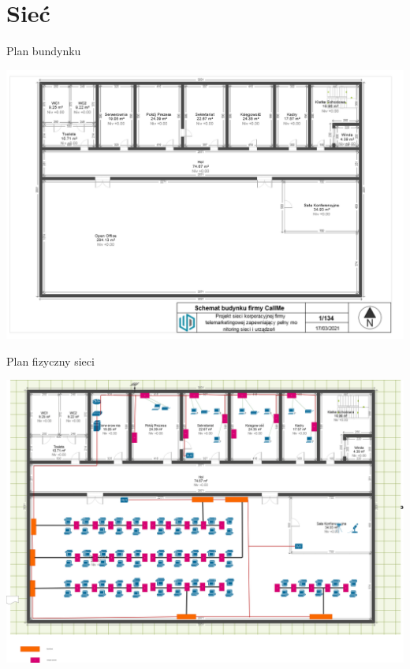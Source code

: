 \documentclass[presentation]{beamer}
\begin{document}
\section{Sieć}
\label{sec:org1869b59}
\begin{frame}[label={sec:orgc63cb2c}]{Plan bundynku}
\begin{center}
\includegraphics[width=.9\linewidth]{./data/siec/plan_budynku.png}
\end{center}
\end{frame}
\begin{frame}[label={sec:org9644cb3}]{Plan fizyczny sieci}
\begin{center}
\includegraphics[width=.9\linewidth]{./data/siec/plan_fizyczny.png}
\end{center}
\end{frame}
\end{document}
